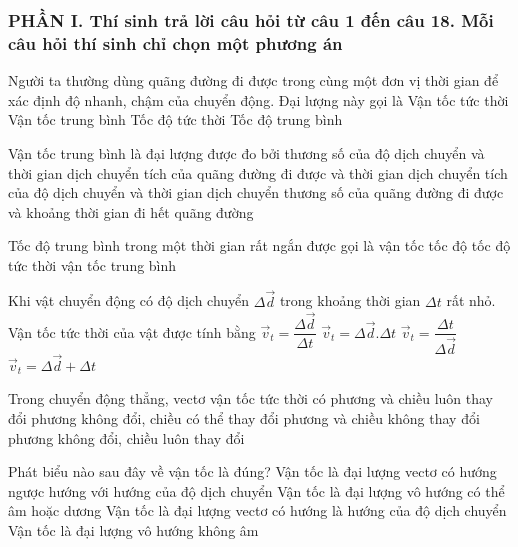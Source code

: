 \subsubsection*{PHẦN I. Thí sinh trả lời câu hỏi từ câu 1 đến câu 18. Mỗi câu hỏi thí sinh chỉ chọn một phương án}
\setcounter{ex}{0}
\begin{ex}%
Người ta thường dùng quãng đường đi được trong cùng một đơn vị thời gian để xác định độ nhanh, chậm của chuyển động. Đại lượng này gọi là
\choice
{Vận tốc tức thời}
{Vận tốc trung bình}
{Tốc độ tức thời}
{\True Tốc độ trung bình}

 \end{ex}
\begin{ex}%
Vận tốc trung bình là đại lượng được đo bởi
\choice
{\True thương số của độ dịch chuyển và thời gian dịch chuyển}
{tích của quãng đường đi được và thời gian dịch chuyển}
{tích của độ dịch chuyển và thời gian dịch chuyển}
{thương số của quãng đường đi được và khoảng thời gian đi hết quãng đường}
\loigiai{

}
 \end{ex}
\begin{ex}%
Tốc độ trung bình trong một thời gian rất ngắn được gọi là
\choice
{vận tốc}
{tốc độ}
{\True tốc độ tức thời}
{vận tốc trung bình}
\loigiai{

}
\end{ex}
\begin{ex}%
Khi vật chuyển động có độ dịch chuyển $\Delta \overrightarrow{d}$ trong khoảng thời gian $\Delta t$ rất nhỏ. Vận tốc tức thời của vật được tính bằng
\choice
{\True $\overrightarrow{v}_t=\dfrac{\Delta \overrightarrow{d}}{\Delta t}$}
{$\overrightarrow{v}_t=\Delta \overrightarrow{d}. \Delta t$}
{$\overrightarrow{v}_t=\dfrac{\Delta t}{\Delta \vec{d}}$}
{$\overrightarrow{v}_t=\Delta \overrightarrow{d}+\Delta t$}

\loigiai{
}
 \end{ex}
\begin{ex}%
Trong chuyển động thẳng, vectơ vận tốc tức thời có
\choice
{phương và chiều luôn thay đổi}
{phương không đổi, chiều có thể thay đổi}
{\True phương và chiều không thay đổi}
{phương không đổi, chiều luôn thay đổi}
\loigiai{
}
 \end{ex}
\begin{ex}%
Phát biểu nào sau đây về vận tốc là đúng?
\choice
{Vận tốc là đại lượng vectơ có hướng ngược hướng với hướng của độ dịch chuyển}
{Vận tốc là đại lượng vô hướng có thể âm hoặc dương}
{\True Vận tốc là đại lượng vectơ có hướng là hướng của độ dịch chuyển}
{Vận tốc là đại lượng vô hướng không âm}
\loigiai{

}
 \end{ex}
